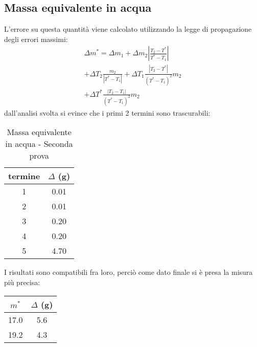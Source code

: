 \documentclass[10pt,twocolumn]{article}
\begin{document}
\subsection{Massa equivalente in acqua}
L'errore su questa quantità viene calcolato utilizzando la legge di propagazione degli errori massimi:
\begin{multline*}
    \Delta m^* = \Delta m_1 + \Delta m_2 \left| \frac{T_2 - T^*}{T^* - T_1} \right| \\
    + \Delta T_2 \frac{m_2}{|T^* - T_1|} + \Delta T_1 \frac{|T_2 - T^*|}{(T^* - T_1)^2} m_2 \\
    + \Delta T^* \frac{|T_2 - T_1|}{(T^* - T_1)^2} m_2\
\end{multline*}
    dall'analisi svolta si evince che i primi 2 termini sono trascurabili:
    \begin{table}[H]
        \centering
   \begin{scriptsize}
				\noindent
		\begin{tabular}{|c|c|}
		\hline
		 termine & $\Delta$ (g)  \\ \hline
		1  & 0.01 \\ \hline
        2  & 0.01 \\ \hline
        3  & 0.20\\ \hline
        4  & 0.20 \\ \hline
        5  & 4.70 \\ \hline
		\end{tabular}
        \caption*{Massa equivalente in acqua - Seconda prova}
    \end{scriptsize}
	\end{table}
I risultati sono compatibili fra loro, perciò come dato finale si è presa la misura più precisa:
  \begin{table}[H]
    \centering
		\begin{tabular}{|c|c|}
		\hline
		$m^*$ & $\Delta$ (g)  \\ \hline
		17.0 & 5.6 \\ \hline
        19.2 & 4.3 \\ \hline
		\end{tabular}
	\end{table}
    \begin{center}
        
    \end{center}
\end{document}
